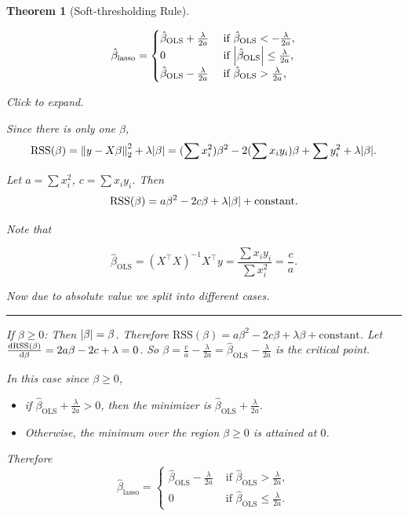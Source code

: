 \documentclass[
  letterpaper,
  DIV=11,
  numbers=noendperiod]{scrreprt}
\providecommand{\tightlist}{%
  \setlength{\itemsep}{0pt}\setlength{\parskip}{0pt}}
\newcommand{\rss}{\mathrm{RSS}}
\newcommand{\ols}{\mathrm{OLS}}
\newcommand{\lasso}{\mathrm{lasso}}
\newcommand{\constant}{\mathrm{constant}}
\theoremstyle{definition}
\theoremstyle{definition}
\theoremstyle{plain}
\newtheorem{theorem}{Theorem}[chapter]
\theoremstyle{plain}
\theoremstyle{remark}
\begin{document}
\begin{theorem}[Soft-thresholding
Rule]\protect\hypertarget{thm-}{}\label{thm-}

\[
\hat\beta_\lasso=\begin{cases}
\hat\beta_\ols+\frac\lambda{2a}& \text{ if }\hat\beta_\ols<-\frac\lambda{2a},\\
0& \text{ if }\abs{\hat\beta_\ols}\leq\frac\lambda{2a},\\
\hat\beta_\ols-\frac\lambda{2a}& \text{ if }\hat\beta_\ols> \frac\lambda{2a},\\
\end{cases}
\]

Click to expand.

Since there is only one \(\beta\), \[
\rss(\beta)=\norm{y-X\beta}_2^2+\lambda\abs{\beta}=(\sum x_i^2)\beta^2-2(\sum x_iy_i)\beta+\sum y_i^2+\lambda\abs{\beta}.
\]

Let \(a=\sum x_i^2\), \(c=\sum x_iy_i\). Then \[
\rss(\beta)=a\beta^2-2c\beta+\lambda\abs{\beta}+\constant.
\]

Note that

\[
\hat\beta_\ols=(X^\top X)^{-1}X^\top y=\frac{\sum x_iy_i}{\sum x_i^2}=\frac ca.
\]

Now due to absolute value we split into different cases.

\begin{center}\rule{0.5\linewidth}{0.5pt}\end{center}

If \(\beta\geq0\): Then \(\abs{\beta}=\beta\). Therefore
\(\rss(\beta)=a\beta^2-2c\beta+\lambda\beta+\constant\). Let
\(\dv{\rss(\beta)}{\beta}=2a\beta-2c+\lambda=0\). So
\(\beta=\frac ca-\frac{\lambda}{2a}=\hat\beta_\ols-\frac\lambda {2a}\)
is the critical point.

In this case since \(\beta\geq 0\),

\begin{itemize}
\tightlist
\item
  if \(\hat\beta_\ols+\frac\lambda {2a}>0\), then the minimizer is
  \(\hat\beta_\ols+\frac\lambda {2a}\).
\item
  Otherwise, the minimum over the region \(\beta\geq 0\) is attained at
  \(0\).
\end{itemize}

Therefore \[
\hat\beta_\lasso=\begin{cases}
\hat\beta_\ols-\frac\lambda{2a}& \text{ if }\hat\beta_\ols> \frac\lambda{2a},\\
0& \text{ if }\hat\beta_\ols\leq \frac\lambda{2a}.
\end{cases}
\]


\end{theorem}
\end{document}
